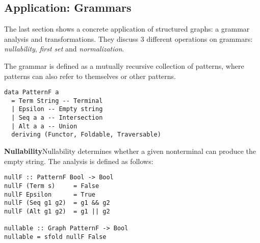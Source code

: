 \subsection{Application: Grammars}\label{subsec:application}

The last section shows a concrete application of structured graphs:
a grammar analysis and transformations. They discuss 3 different operations
on grammars: \emph{nullability}, \emph{first set} and \emph{normalization}.

The grammar is defined as a mutually recursive collection of patterns,
where patterns can also refer to themselves or other patterns.

\vspace{1mm}
\begin{verbatim}
data PatternF a
  = Term String -- Terminal
  | Epsilon -- Empty string
  | Seq a a -- Intersection
  | Alt a a -- Union
  deriving (Functor, Foldable, Traversable)
\end{verbatim}
\vspace{1mm}

\textbf{Nullability}\quad Nullability determines whether a given nonterminal can produce the empty string. The analysis is defined as follows:

\vspace{1mm}
\begin{verbatim}
nullF :: PatternF Bool -> Bool
nullF (Term s)     = False
nullF Epsilon      = True
nullF (Seq g1 g2)  = g1 && g2
nullF (Alt g1 g2)  = g1 || g2

nullable :: Graph PatternF -> Bool
nullable = sfold nullF False
\end{verbatim}
\vspace{1mm}
